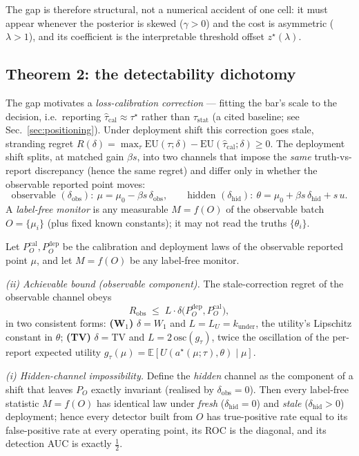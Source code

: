 The gap is therefore structural, not a numerical accident of one cell: it must appear whenever the
posterior is skewed ($\gamma>0$) and the cost is asymmetric ($\lambda>1$), and its coefficient is the
interpretable threshold offset $z^\star(\lambda)$.

\subsection{Theorem 2: the detectability dichotomy}
\label{sec:thm2}

The gap motivates a \emph{loss-calibration correction} --- fitting the bar's scale to the decision,
i.e.\ reporting $\hat\tau_{\mathrm{cal}}\approx\tau^\star$ rather than $\tau_{\mathrm{stat}}$ (a cited
baseline; see Sec.~\ref{sec:positioning}). Under deployment shift this correction goes stale,
stranding regret
$R(\delta)=\max_\tau \mathrm{EU}(\tau;\delta)-\mathrm{EU}(\hat\tau_{\mathrm{cal}};\delta)\ge 0$.
The deployment shift splits, at matched gain $\beta s$, into two channels that impose the \emph{same}
truth-vs-report discrepancy (hence the same regret) and differ only in whether the observable reported
point moves:
\[
\text{observable } (\delta_{\mathrm{obs}}):\ \mu=\mu_0-\beta s\,\delta_{\mathrm{obs}},
\qquad
\text{hidden } (\delta_{\mathrm{hid}}):\ \theta=\mu_0+\beta s\,\delta_{\mathrm{hid}}+s\,u .
\]
A \emph{label-free monitor} is any measurable $M=f(O)$ of the observable batch $O=\{\mu_i\}$ (plus
fixed known constants); it may not read the truths $\{\theta_i\}$.

\begin{theorem}
\label{thm:detect}
Let $P_O^{\mathrm{cal}},P_O^{\mathrm{dep}}$ be the calibration and deployment laws of the observable
reported point $\mu$, and let $M=f(O)$ be any label-free monitor.

\emph{(ii) Achievable bound (observable component).} The stale-correction regret of the observable
channel obeys
\begin{equation}
R_{\mathrm{obs}} \;\le\; L\cdot\delta\bigl(P_O^{\mathrm{dep}},P_O^{\mathrm{cal}}\bigr),
\label{eq:bound}
\end{equation}
in two consistent forms: \textbf{(W$_1$)} $\delta=W_1$ and $L=L_U=k_{\mathrm{under}}$, the utility's
Lipschitz constant in $\theta$; \textbf{(TV)} $\delta=\mathrm{TV}$ and $L=2\,\mathrm{osc}(g_\tau)$,
twice the oscillation of the per-report expected utility
$g_\tau(\mu)=\mathbb{E}[U(a^\star(\mu;\tau),\theta)\mid\mu]$.

\emph{(i) Hidden-channel impossibility.} Define the \emph{hidden} channel as the component of a shift
that leaves $P_O$ exactly invariant (realised by $\delta_{\mathrm{obs}}=0$). Then every label-free
statistic $M=f(O)$ has identical law under \emph{fresh} ($\delta_{\mathrm{hid}}=0$) and \emph{stale}
($\delta_{\mathrm{hid}}>0$) deployment; hence every detector built from $O$ has true-positive rate
equal to its false-positive rate at every operating point, its ROC is the diagonal, and its detection
AUC is exactly $\tfrac12$.
\end{theorem}

